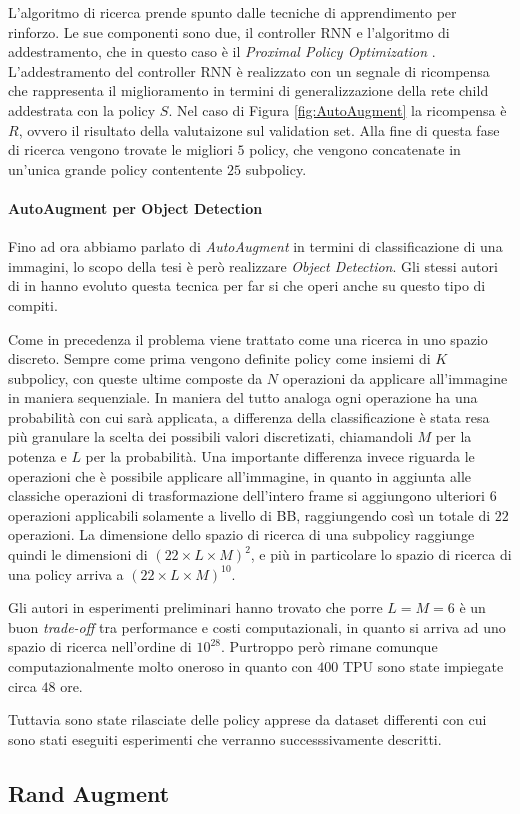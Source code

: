 L'algoritmo di ricerca prende spunto dalle tecniche di apprendimento per rinforzo. Le sue componenti sono due, il controller \ac{RNN} e l'algoritmo di addestramento, che in questo caso è il \textit{Proximal Policy Optimization} \cite{DBLP:journals/corr/SchulmanWDRK17}. L'addestramento del controller \ac{RNN} è realizzato con un segnale di ricompensa che rappresenta il miglioramento in termini di generalizzazione della rete child addestrata con la policy $S$. Nel caso di Figura \ref{fig:AutoAugment} la ricompensa è $R$, ovvero il risultato della valutaizone sul validation set. Alla fine di questa fase di ricerca vengono trovate le migliori $5$ policy, che vengono concatenate in un'unica grande policy contentente $25$ subpolicy.
\paragraph{AutoAugment per Object Detection}
Fino ad ora abbiamo parlato di \textit{AutoAugment} in termini di classificazione di una immagini, lo scopo della tesi è però realizzare \textit{Object Detection}. Gli stessi autori di \cite{DBLP:journals/corr/abs-1805-09501} in \cite{DBLP:journals/corr/abs-1906-11172} hanno evoluto questa tecnica per far si che operi anche su questo tipo di compiti.

Come in precedenza il problema viene trattato come una ricerca in uno spazio discreto. Sempre come prima vengono definite policy come insiemi di $K$ subpolicy, con queste ultime composte da $N$ operazioni da applicare all'immagine in maniera sequenziale. In maniera del tutto analoga ogni operazione ha una probabilità con cui sarà applicata, a differenza della classificazione è stata resa più granulare la scelta dei possibili valori discretizati, chiamandoli $M$ per la potenza e $L$ per la probabilità. 
Una importante differenza invece riguarda le operazioni che è possibile applicare all'immagine, in quanto in aggiunta alle classiche operazioni di trasformazione dell'intero frame si aggiungono ulteriori $6$ operazioni applicabili solamente a livello di \ac{BB}, raggiungendo così un totale di $22$ operazioni. La dimensione dello spazio di ricerca di una subpolicy raggiunge quindi le dimensioni di $(22 \times L \times M)^2$, e più in particolare lo spazio di ricerca di una policy arriva a $(22 \times L \times M)^{10}$.

Gli autori in esperimenti preliminari hanno trovato che porre $L = M = 6$ è un buon \textit{trade-off} tra performance e costi computazionali, in quanto si arriva ad uno spazio di ricerca nell'ordine di $10^{28}$. Purtroppo però rimane comunque computazionalmente molto oneroso in quanto con $400$ \ac{TPU} sono state impiegate circa $48$ ore. 

Tuttavia sono state rilasciate delle policy apprese da dataset differenti con cui sono stati eseguiti esperimenti che verranno successsivamente descritti. 
\subsection{Rand Augment}
\label{subsec:rand_augment}